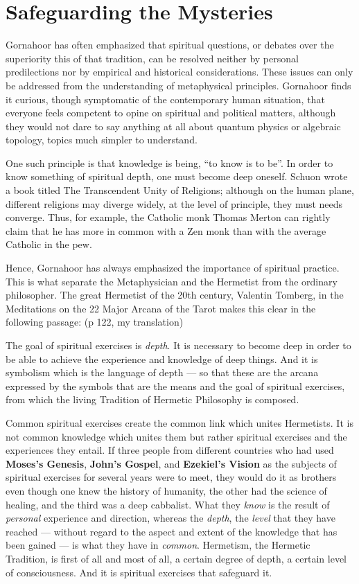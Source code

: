 \section{Safeguarding the Mysteries}

Gornahoor has often emphasized that spiritual questions, or debates over the superiority this of that tradition, can be resolved neither by personal predilections nor by empirical and historical considerations. These issues can only be addressed from the understanding of metaphysical principles. Gornahoor finds it curious, though symptomatic of the contemporary human situation, that everyone feels competent to opine on spiritual and political matters, although they would not dare to say anything at all about quantum physics or algebraic topology, topics much simpler to understand.

One such principle is that knowledge is being, ``to know is to be''. In order to know something of spiritual depth, one must become deep oneself. Schuon wrote a book titled The Transcendent Unity of Religions; although on the human plane, different religions may diverge widely, at the level of principle, they must needs converge. Thus, for example, the Catholic monk Thomas Merton can rightly claim that he has more in common with a Zen monk than with the average Catholic in the pew.

Hence, Gornahoor has always emphasized the importance of spiritual practice. This is what separate the Metaphysician and the Hermetist from the ordinary philosopher. The great Hermetist of the 20th century, Valentin Tomberg, in the Meditations on the 22 Major Arcana of the Tarot makes this clear in the following passage: (p 122, my translation)

\begin{quotationx}
The goal of spiritual exercises is \emph{depth}. It is necessary to become deep in order to be able to achieve the experience and knowledge of deep things. And it is symbolism which is the language of depth --- so that these are the arcana expressed by the symbols that are the means and the goal of spiritual exercises, from which the living Tradition of Hermetic Philosophy is composed.

Common spiritual exercises create the common link which unites Hermetists. It is not common knowledge which unites them but rather spiritual exercises and the experiences they entail. If three people from different countries who had used \textbf{Moses's Genesis}, \textbf{John's Gospel}, and \textbf{Ezekiel's Vision} as the subjects of spiritual exercises for several years were to meet, they would do it as brothers even though one knew the history of humanity, the other had the science of healing, and the third was a deep cabbalist. What they \emph{know} is the result of \emph{personal} experience and direction, whereas the \emph{depth}, the \emph{level} that they have reached --- without regard to the aspect and extent of the knowledge that has been gained --- is what they have in \emph{common}. Hermetism, the Hermetic Tradition, is first of all and most of all, a certain degree of depth, a certain level of consciousness. And it is spiritual exercises that safeguard it.
\end{quotationx}



